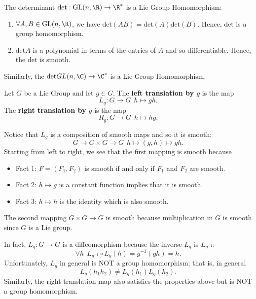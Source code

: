 \begin{eg}
   The determinant \( \text{det} : \text{GL}(n, \R) \to \R^{*} \) is a Lie Group Homomorphism: 
   \begin{enumerate}
       \item[(i)] \( \forall A,B \in \text{GL}(n, \R)  \), we have \( \text{det}(AB) = \text{det}(A) \text{det}(B) \). Hence, \( \text{det}  \) is a group homomorphism.
        \item[(ii)] \( \text{det} A   \) is a polynomial in terms of the entries of \( A  \) and so differentiable. Hence, the \( \text{det}  \) is smooth. 
   \end{enumerate}
   Similarly, the \( \text{det} GL(n, \C) \to \C^{*} \) is a Lie Group Homomorphism.
\end{eg}

\begin{eg}
   Let \( G  \) be a Lie Group and let \( g \in G  \). The \textbf{left translation by \( g  \)} is the map
   \[  {L}_{g} : G \to G \ \ h \mapsto gh. \]
   The \textbf{right translation by \( g \)} is the map
   \[  R_{g}: G \to G \ \ h \mapsto hg. \]
\end{eg}

Notice that \( {L}_{g}  \) is a composition of smooth maps and so it is smooth:
\[  G \to G \times G \to G  \ \ h \mapsto (g,h) \mapsto gh. \]
Starting from left to right, we see that the first mapping is smooth because
\begin{itemize}
    \item Fact 1: \( F = ({F}_{1}, {F}_{2}) \) is smooth if and only if \( {F}_{1}  \) and \( {F}_{2} \) are smooth.
    \item Fact 2: \( h \mapsto g  \) is a constant function implies that it is smooth.
    \item Fact 3: \( h \mapsto h  \) is the identity which is also smooth.
\end{itemize}
The second mapping \( G \times G \to G \) is smooth because multiplication in \( G  \) is smooth since \( G  \) is a Lie group.

In fact, \( {L}_{g} : G \to G  \) is a diffeomorphism because the inverse \( {L}_{g}  \) is \( {L}_{g^{-1}} \):
\[  \forall h \ \ {L}_{g^{-1}} \circ {L}_{g} (h) = g^{-1}(gh) = h.  \]
Unfortunately, \( {L}_{g} \) in general is NOT a group homomorphism; that is, in general
\[  {L}_{g}({h}_{1} {h}_{2}) \neq {L}_{g}({h}_{1}) {L}_{g}({h}_{2}). \]
Similarly, the right translation map also satisfies the properties above but is NOT a group homomorphism.

